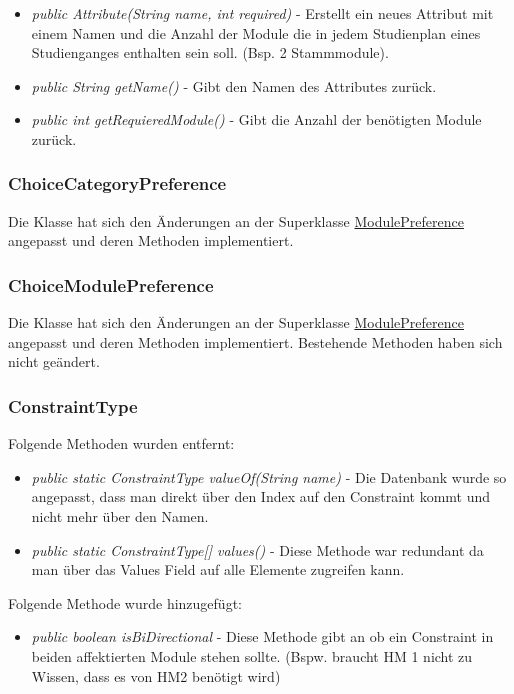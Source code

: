 \documentclass[parskip=full]{scrartcl}
\begin{document}
				\begin{itemize}
					\item \textit{public Attribute(String name, int required)} - Erstellt ein neues Attribut mit einem Namen und die Anzahl der Module die in jedem Studienplan eines Studienganges enthalten sein soll. (Bsp. 2 Stammmodule).
					\item \textit{public String getName()} - Gibt den Namen des Attributes zurück.
					\item \textit{public int getRequieredModule()} - Gibt die Anzahl der benötigten Module zurück.
				\end{itemize}
			
			\subsubsection{ChoiceCategoryPreference}
				Die Klasse hat sich den Änderungen an der Superklasse \hyperlink{model:ModulePreference}{ModulePreference} angepasst und deren Methoden implementiert.
			
			\subsubsection{ChoiceModulePreference}
				Die Klasse hat sich den Änderungen an der Superklasse \hyperlink{model:ModulePreference}{ModulePreference} angepasst und deren Methoden implementiert. Bestehende Methoden haben sich nicht geändert.
				
			\subsubsection{ConstraintType}
				Folgende Methoden wurden entfernt:
				\begin{itemize}
					\item \textit{public static ConstraintType valueOf(String name)} - Die Datenbank wurde so angepasst, dass man direkt über den Index auf den Constraint kommt und nicht mehr über den Namen.
					\item \textit{public static ConstraintType[] values()} - Diese Methode war redundant da man über das Values Field auf alle Elemente zugreifen kann.
				\end{itemize}
				Folgende Methode wurde hinzugefügt:
				\begin{itemize}
					\item \textit{public boolean isBiDirectional} - Diese Methode gibt an ob ein Constraint in beiden affektierten Module stehen sollte. (Bspw. braucht HM 1 nicht zu Wissen, dass es von HM2 benötigt wird)
				\end{itemize}
			
\end{document}
